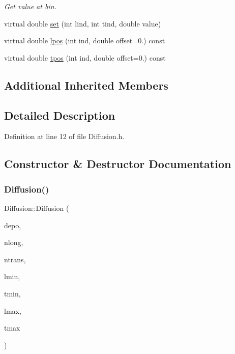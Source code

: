 \begin{DoxyCompactItemize}
\begin{DoxyCompactList}\small\item\em Get value at bin. \end{DoxyCompactList}\item 
virtual double \hyperlink{class_wire_cell_1_1_diffusion_a18df718cd15d36f105c5eb2f4039b320}{set} (int lind, int tind, double value)
\item 
virtual double \hyperlink{class_wire_cell_1_1_diffusion_a406a933c156b668dc25555e4aa851567}{lpos} (int ind, double offset=0.) const
\item 
virtual double \hyperlink{class_wire_cell_1_1_diffusion_a86e78fa0c302bbbd2e1329b3f0294454}{tpos} (int ind, double offset=0.) const
\end{DoxyCompactItemize}
\subsection*{Additional Inherited Members}


\subsection{Detailed Description}


Definition at line 12 of file Diffusion.\+h.



\subsection{Constructor \& Destructor Documentation}
\mbox{\label{class_wire_cell_1_1_diffusion_a5cec68960d93a5a1293b1c3539035cca}} 
\subsubsection{\texorpdfstring{Diffusion()}{Diffusion()}\hspace{0.1cm}{\footnotesize\ttfamily [1/2]}}
{\footnotesize\ttfamily Diffusion\+::\+Diffusion (\begin{DoxyParamCaption}\item[{\hyperlink{class_wire_cell_1_1_i_data_aff870b3ae8333cf9265941eef62498bc}{I\+Depo\+::pointer}}]{depo,  }\item[{int}]{nlong,  }\item[{int}]{ntrans,  }\item[{double}]{lmin,  }\item[{double}]{tmin,  }\item[{double}]{lmax,  }\item[{double}]{tmax }\end{DoxyParamCaption})}



